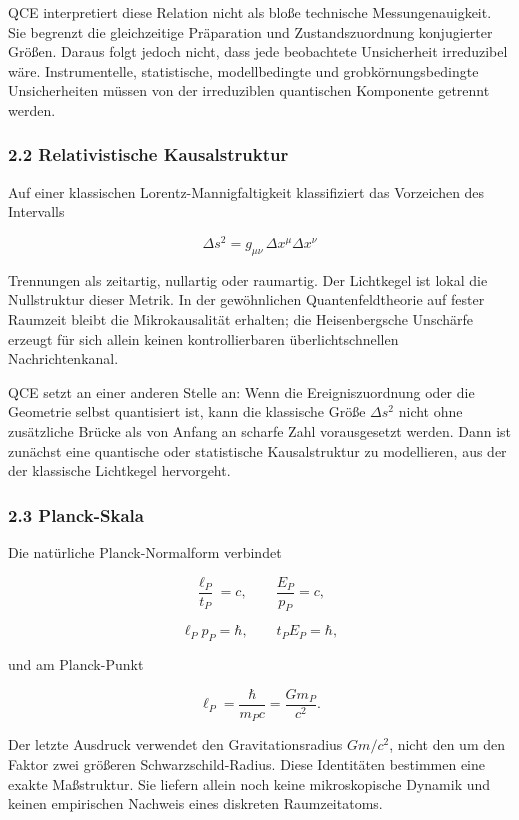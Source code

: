 \documentclass[
  11pt,
  a4paper,
]{article}
\begin{document}
QCE interpretiert diese Relation nicht als bloße technische
Messungenauigkeit. Sie begrenzt die gleichzeitige Präparation und
Zustandszuordnung konjugierter Größen. Daraus folgt jedoch nicht, dass
jede beobachtete Unsicherheit irreduzibel wäre. Instrumentelle,
statistische, modellbedingte und grobkörnungsbedingte Unsicherheiten
müssen von der irreduziblen quantischen Komponente getrennt werden.

\subsubsection{2.2 Relativistische
Kausalstruktur}\label{relativistische-kausalstruktur}

Auf einer klassischen Lorentz-Mannigfaltigkeit klassifiziert das
Vorzeichen des Intervalls

\[
\Delta s^2 = g_{\mu\nu}\,\Delta x^\mu\Delta x^\nu
\]

Trennungen als zeitartig, nullartig oder raumartig. Der Lichtkegel ist
lokal die Nullstruktur dieser Metrik. In der gewöhnlichen
Quantenfeldtheorie auf fester Raumzeit bleibt die Mikrokausalität
erhalten; die Heisenbergsche Unschärfe erzeugt für sich allein keinen
kontrollierbaren überlichtschnellen Nachrichtenkanal.

QCE setzt an einer anderen Stelle an: Wenn die Ereigniszuordnung oder
die Geometrie selbst quantisiert ist, kann die klassische Größe
\(\Delta s^2\) nicht ohne zusätzliche Brücke als von Anfang an scharfe
Zahl vorausgesetzt werden. Dann ist zunächst eine quantische oder
statistische Kausalstruktur zu modellieren, aus der der klassische
Lichtkegel hervorgeht.

\subsubsection{2.3 Planck-Skala}\label{planck-skala}

Die natürliche Planck-Normalform verbindet

\[
\frac{\ell_P}{t_P}=c,
\qquad
\frac{E_P}{p_P}=c,
\]

\[
\ell_Pp_P=\hbar,
\qquad
t_PE_P=\hbar,
\]

und am Planck-Punkt

\[
\ell_P=\frac{\hbar}{m_Pc}=\frac{Gm_P}{c^2}.
\]

Der letzte Ausdruck verwendet den Gravitationsradius \(Gm/c^2\), nicht
den um den Faktor zwei größeren Schwarzschild-Radius. Diese Identitäten
bestimmen eine exakte Maßstruktur. Sie liefern allein noch keine
mikroskopische Dynamik und keinen empirischen Nachweis eines diskreten
Raumzeitatoms.
\end{document}
